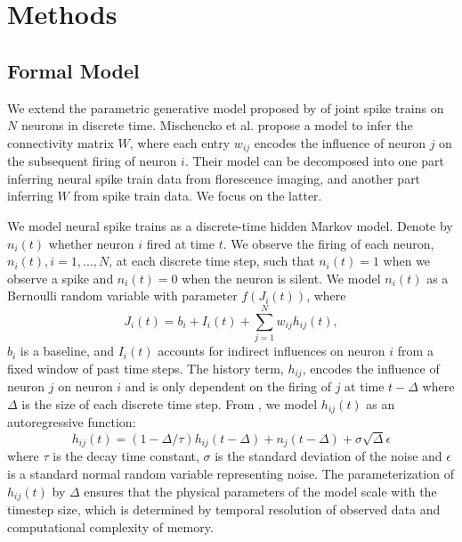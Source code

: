 \documentclass{article}
\begin{document}
\section{Methods}

\subsection{Formal Model}
We extend the parametric generative model proposed by
\citep{mishchencko2011} of joint spike trains on $N$ neurons in
discrete time. Mischencko et al. propose a model to infer the
connectivity matrix $W$, where each entry $w_{ij}$ encodes the
influence of neuron $j$ on the subsequent firing of neuron $i$. Their
model can be decomposed into one part inferring neural spike train
data from florescence imaging, and another part inferring $W$ from
spike train data. We focus on the latter.

We model neural spike trains as a discrete-time hidden Markov model.
Denote by $ n_i(t) $ whether neuron $i$ fired at time $t$. We observe
the firing of each neuron, $n_i(t), i = 1,...,N$, at each discrete
time step, such that $n_i(t) = 1$ when we observe a spike and $n_i(t)
= 0$ when the neuron is silent. We model $n_i(t)$ as a Bernoulli
random variable with parameter $f(J_i(t))$, where
\begin{equation}
\label{J} J_i(t) = b_i + I_i(t) + \sum_{j=1}^{N} w_{ij}h_{ij}(t),
\end{equation}
$b_i$ is a baseline, and $I_i(t)$ accounts for indirect
influences on neuron $i$ from a fixed window of past time steps.
The history term, $h_{ij}$, encodes the influence of neuron $j$ on
neuron $i$ and is only dependent on the firing of $j$ at time
$t-\Delta$ where $\Delta$ is the size of each discrete time step.
From \citep{mishchencko2011}, we model $h_{ij}(t)$ as an autoregressive
function:
\begin{equation}
\label{h} h_{ij}(t) = (1-\Delta/\tau)h_{ij}(t-\Delta)
  + n_j(t-\Delta)+\sigma\sqrt{\Delta}\epsilon
\end{equation}
where $ \tau$ is the decay time constant, $\sigma$
is the standard deviation of the noise and $\epsilon$ is a
standard normal random variable representing noise.  The parameterization
of $h_{ij}(t)$ by $\Delta$ ensures that the physical parameters of
the model scale with the timestep size, which is determined by
temporal resolution of observed data and computational complexity
of memory.

\end{document}
